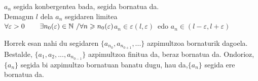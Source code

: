 \begin{propietate}
\item
${a_{n} }$ segida konbergentea bada, segida bornatua da.\\ 

\underline{} Demagun $l$ dela ${a_{n} }$ segidaren limitea\\

$\forall \varepsilon > 0 \hspace{0.75cm}\exists n_{0}(\varepsilon)\in \mathbb N \ / \forall n\geqslant n_{0}(\varepsilon)$\hspace{0.75cm}\underline{${a_{n} } \in \varepsilon(l,\varepsilon)$}\  edo  \underline{${a_{n} }\in(l-\varepsilon, l+\varepsilon)$}\\

\vspace*{0.10in}


\vspace*{0.15in}

Horrek esan nahi du segidaren $\lbrace {a_{n}_{0}}, {a_{n}_{0+1}},... \rbrace$ azpimultzoa bornaturik dagoela. Bestalde, $\lbrace {a_{1} },{a_{2} },...,{a_{n}_{0-1}} \rbrace$ azpimultzoa finitua da, beraz bornatua da.
Ondorioz, $\lbrace{a_{n} }\rbrace$ segida bi azpimultzo bornatuan banatu dugu, hau da,$\lbrace{a_{n} }\rbrace$ segida ere bornatua da.\
\end{propietate}

